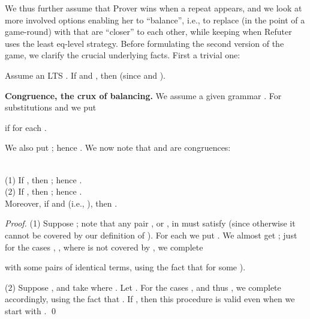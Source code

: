 \documentclass{llncs}
\begin{document}
We thus further assume that Prover wins when a repeat appears,
and we look at more involved options
enabling her to ``balance'', i.e., to replace
 (in the point  of a game-round)
with   that are 
``closer'' to each other, while 
keeping  
when Refuter
uses the least eq-level strategy.
Before formulating the second version of the game,
we clarify the crucial underlying facts. First a trivial one:

\begin{proposition}\label{prop:basicreplace}
Assume an LTS .
	If  and ,
then 
(since  and ). 
\end{proposition}


\textbf{Congruence, the crux of balancing.}
We assume a given grammar .
For substitutions
 and  we put
\begin{center}
 
if 
 for
each .
\end{center}
We also put
; hence
.
We now note that  and  are congruences:

\begin{proposition}\label{prop:congruence}\hfill\\
(1) If , then ;
hence .
\\
(2) If , 
then ; 
hence .
\\
Moreover, if  and
 (i.e., ),
then .
\end{proposition}	

\begin{proof}
(1) Suppose ; note that any pair , or ,
in 
must satisfy  (since otherwise it cannot be covered by our
definition of ).
For each  we put . We almost get
; just for the cases 
, , where 
  is not
 covered by , we complete  
 
 with some pairs of identical
 terms, using the fact that 
  for some ).

(2) Suppose , and take 
  where . 
Let .
For the cases , and thus 
, we complete 
  accordingly, using the fact that 
. If , then this procedure
is valid even when we 
start with
.
\qed
\end{proof}
\end{document}

